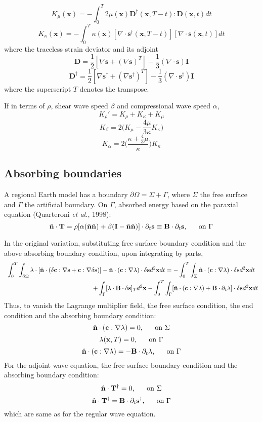 \documentclass{article}
\newcommand{\mbf}[1]{\mathbf{#1}}
\newcommand{\etal}{\textit{et al.}}
\begin{document}
\[ K_\mu(\mbf x)=-\int_0^T2\mu(\mbf x)\mbf D^\dagger(\mbf x,T-t):\mbf D(\mbf x,t)dt \]
\[ K_\kappa(\mbf x)=-\int_0^T\kappa(\mbf x)[\nabla\cdot\mbf s^\dagger(\mbf x,T-t)][\nabla\cdot\mbf s(\mbf x,t)]dt \]
where the traceless strain deviator and its adjoint
\[ \mbf D=\frac{1}{2}[\nabla\mbf s+(\nabla\mbf s)^T]-\frac{1}{3}(\nabla\cdot\mbf s)\mbf I \]
\[ \mbf D^\dagger=\frac{1}{2}[\nabla\mbf s^\dagger+(\nabla\mbf s^\dagger)^T]-\frac{1}{3}(\nabla\cdot\mbf s^\dagger)\mbf I \]
where the superscript $T$ denotes the transpose.\par
If in terms of $\rho$, shear wave speed $\beta$ and compressional wave speed $\alpha$,
\[ K_\rho'=K_\rho+K_\kappa+K_\mu \]
\[ K_\beta=2\Big(K_\mu-\frac{4\mu}{3\kappa}K_\kappa\Big) \]
\[ K_\alpha=2\bigg(\frac{\kappa+\frac{4}{3}\mu}{\kappa}\bigg)K_\kappa \]\par
\subsection{Absorbing boundaries}
A regional Earth model has a boundary $\partial\Omega=\Sigma+\Gamma$, where $\Sigma$ the free surface and $\Gamma$ the artificial boundary. On $\Gamma$, absorbed energy based on the paraxial equation (Quarteroni \etal, 1998):
\[ \hat{\mbf n}\cdot\mbf T=\rho[\alpha(\hat{\mbf n}\hat{\mbf n})+\beta(\mbf I-\hat{\mbf n}\hat{\mbf n})]\cdot\partial_t\mbf s\equiv\mbf B\cdot\partial_t\mbf s \text{,\hspace{5mm} on } \Gamma \]\par
In the original variation, substituting free surface boundary condition and the above absorbing boundary condition, upon integrating by parts,
\begin{gather*}
  \int_0^T\int_{\partial\Omega}\lambda\cdot[\hat{\mbf n}\cdot(\delta\mbf c:\nabla\mbf s+\mbf c:\nabla\delta\mbf s)]-\hat{\mbf n}\cdot(\mbf c:\nabla\lambda)\cdot\delta\mbf sd^2\mbf xdt=-\int_0^T\int_\Sigma\hat{\mbf n}\cdot(\mbf c:\nabla\lambda)\cdot\delta\mbf sd^2\mbf xdt \\
  \hspace{50mm} +\int_\Gamma[\lambda\cdot\mbf B\cdot\delta\mbf s]_Td^2\mbf x-\int_0^T\int_\Gamma[\hat{\mbf n}\cdot(\mbf c:\nabla\lambda)+\mbf B\cdot\partial_t\lambda]\cdot\delta\mbf sd^2\mbf xdt
\end{gather*}
Thus, to vanish the Lagrange multiplier field, the free surface condition, the end condition and the absorbing boundary condition:
\[ \hat{\mbf n}\cdot(\mbf c:\nabla\lambda)=0 \text{,\hspace{5mm} on } \Sigma \]
\[ \lambda(\mbf x,T)=0 \text{,\hspace{5mm} on } \Gamma \]
\[ \hat{\mbf n}\cdot(\mbf c:\nabla\lambda)=-\mbf B\cdot\partial_t\lambda \text{,\hspace{5mm} on } \Gamma \]
For the adjoint wave equation, the free surface boundary condition and the absorbing boundary condition:
\[ \hat{\mbf n}\cdot\mbf T^\dagger=0 \text{,\hspace{5mm} on } \Sigma \]
\[ \hat{\mbf n}\cdot\mbf T^\dagger=\mbf B\cdot\partial_t\mbf s^\dagger \text{,\hspace{5mm} on } \Gamma \]
which are same as for the regular wave equation.\par
\end{document}
